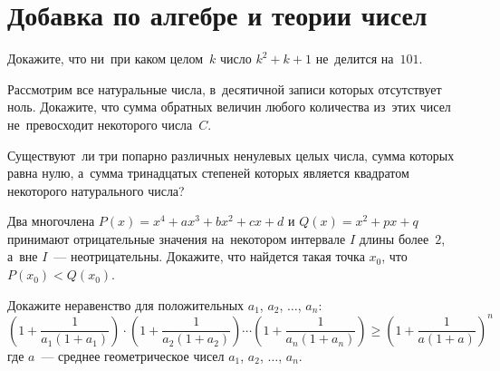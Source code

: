 

\section*{Добавка по алгебре и теории чисел}


\begin{problems}

\item
Докажите, что ни~при каком целом~$k$ число $k^2 + k + 1$ не~делится на~$101$.

\item
Рассмотрим все натуральные числа, в~десятичной записи которых отсутствует ноль.
Докажите, что сумма обратных величин любого количества из~этих чисел
не~превосходит некоторого числа~$C$.

\item
Существуют~ли три попарно различных ненулевых целых числа, сумма которых равна
нулю, а~сумма тринадцатых степеней которых является квадратом некоторого
натурального числа?

\item
Два многочлена
$P(x) = x^4 + a x^3 + b x^2 + c x + d$ и $Q(x) = x^2 + p x + q$
принимают отрицательные значения на~некотором интервале $I$ длины более~$2$,
а~вне $I$~--- неотрицательны.
Докажите, что найдется такая точка $x_0$, что $P(x_0) < Q(x_0)$.

\item
Докажите неравенство для положительных $a_1$, $a_2$, $\ldots$, $a_n$:
\[
    \left(
        1 + \frac{1}{a_1 (1 + a_1)}
    \right)
    \cdot
    \left(
        1 + \frac{1}{a_2 (1 + a_2)}
    \right)
    \cdots
    \left(
        1 + \frac{1}{a_n (1 + a_n)}
    \right)
\geq
    \left(
        1 + \frac{1}{a (1 + a)}
    \right)^{\!n}
\]
где $a$~--- среднее геометрическое чисел $a_1$, $a_2$, $\ldots$, $a_n$.
    
\end{problems}

